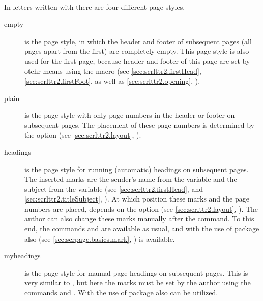 \begin{Declaration}
\\
\\
\\
\\
\end{Declaration}
%
%
%
%
%
%
In letters written with  there are four different
page styles.
\begin{description}
\item[empty] is the page style, in which the header and footer of
  subsequent pages (all pages apart from the first) are completely
  empty. This page style is also used for the first page, because
  header and footer of this page are set by otehr means using the
  macro  (see
  \autoref{sec:scrlttr2.firstHead}, \autoref{sec:scrlttr2.firstFoot},
  as well as \autoref{sec:scrlttr2.opening},
  ).

\item[plain] is the page style with only page numbers in the header or
  footer on subsequent pages. The placement of these page numbers is
  determined by the option  (see
  \autoref{sec:scrlttr2.layout},
  ).

\item[headings] is the page style for running (automatic) headings on
  subsequent pages. The inserted marks are the sender's name from the
  variable  and the subject
  from the variable  (see
  \autoref{sec:scrlttr2.firstHead},
   and
  \autoref{sec:scrlttr2.titleSubject},
  ). At which position
  these marks and the page numbers are placed, depends on the option
   (see \autoref{sec:scrlttr2.layout},
  ). The author can also
  change these marks manually after the  command. To
  this end, the commands  and  are
  available as usual, and with the use of package 
  also  (see \autoref{sec:scrpage.basics.mark},
  ) is available.

\item[myheadings] is the page style for manual page headings on
  subsequent pages. This is very similar to , but
  here the marks must be set by the author using the commands
   and
  .  With the use of package
   also  can be utilized.
\end{description}

